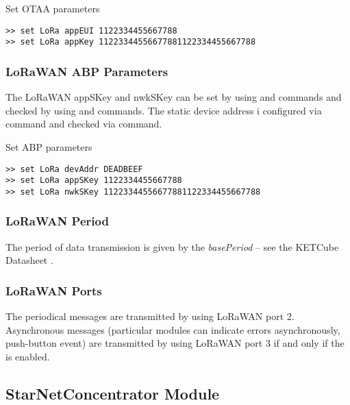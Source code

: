 \begin{docCodeExampleTitled}{Set OTAA parameters}
\begin{verbatim}
>> set LoRa appEUI 1122334455667788
>> set LoRa appKey 11223344556677881122334455667788
\end{verbatim}
\end{docCodeExampleTitled}
  
\subsubsection{LoRaWAN ABP Parameters}
The LoRaWAN appSKey and nwkSKey can be set by using  and  commands and checked by using  and  commands. The static device address i configured via   command and checked via   command.
  
\begin{docCodeExampleTitled}{Set ABP parameters}
\begin{verbatim}
>> set LoRa devAddr DEADBEEF
>> set LoRa appSKey 1122334455667788
>> set LoRa nwkSKey 11223344556677881122334455667788
\end{verbatim}
\end{docCodeExampleTitled}

\subsubsection{LoRaWAN Period}
The period of data transmission is given by the {\it basePeriod} -- see the KETCube Datasheet \cite{ZCU:KETCube:05-2018}.

\subsubsection{LoRaWAN Ports}

  The periodical messages are transmitted by using LoRaWAN port 2. Asynchronous messages (particular modules can indicate errors asynchronously, push-button event) are transmitted by using LoRaWAN port 3 if and only if the  is enabled.

\clearpage
\subsection{StarNetConcentrator Module}

